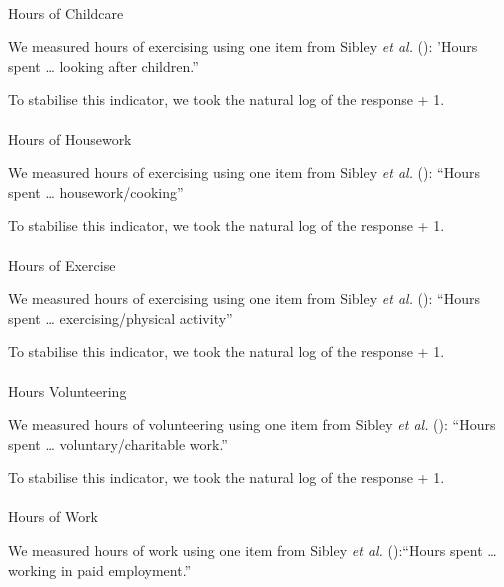 \documentclass[
  singlecolumn]{article}
\makeatletter
\let\oldparagraph\paragraph
\renewcommand{\paragraph}{
    \@ifstar
      \xxxParagraphStar
      \xxxParagraphNoStar
  }
\newcommand{\xxxParagraphStar}[1]{\oldparagraph*{#1}\mbox{}}
\newcommand{\xxxParagraphNoStar}[1]{\oldparagraph{#1}\mbox{}}
\makeatother
\begin{document}
\paragraph{Hours of Childcare}\label{hours-of-childcare}

We measured hours of exercising using one item from Sibley \emph{et al.}
(): 'Hours spent \ldots{} looking after
children.''

To stabilise this indicator, we took the natural log of the response +
1.

\paragraph{Hours of Housework}\label{hours-of-housework}

We measured hours of exercising using one item from Sibley \emph{et al.}
(): ``Hours spent \ldots{}
housework/cooking''

To stabilise this indicator, we took the natural log of the response +
1.

\paragraph{Hours of Exercise}\label{hours-of-exercise}

We measured hours of exercising using one item from Sibley \emph{et al.}
(): ``Hours spent \ldots{}
exercising/physical activity''

To stabilise this indicator, we took the natural log of the response +
1.

\paragraph{Hours Volunteering}\label{hours-volunteering}

We measured hours of volunteering using one item from Sibley \emph{et
al.} (): ``Hours spent \ldots{}
voluntary/charitable work.''

To stabilise this indicator, we took the natural log of the response +
1.

\paragraph{Hours of Work}\label{hours-of-work}

We measured hours of work using one item from Sibley \emph{et al.}
():``Hours spent \ldots{} working in paid
employment.''
\end{document}
